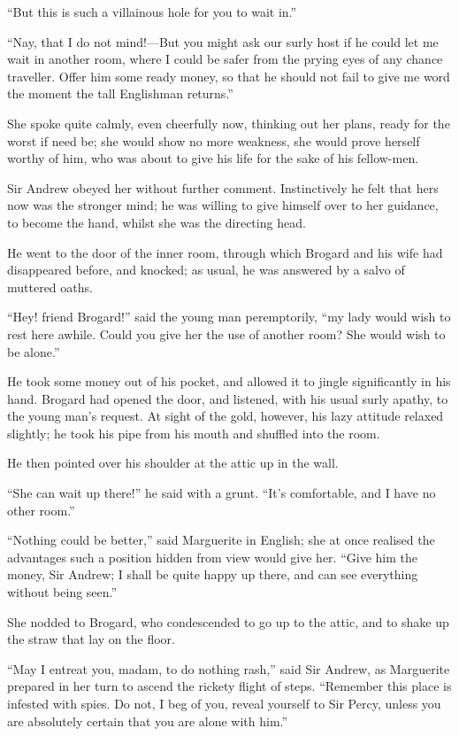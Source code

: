 \documentclass[paper=5.5in:8.5in,BCOR=7mm,twoside,DIV=calc,12pt,usegeometry,chapterprefix,endperiod,headings=big]{scrbook}
\begin{document}
\enquote{But this is such a villainous hole for you to wait in.}

\enquote{Nay, that I do not mind!---But you might ask our surly host if he could let me wait in another room, where I could be safer from the prying eyes of any chance traveller. Offer him some ready money, so that he should not fail to give me word the moment the tall Englishman returns.}

She spoke quite calmly, even cheerfully now, thinking out her plans, ready for the worst if need be; she would show no more weakness, she would prove herself worthy of him, who was about to give his life for the sake of his fellow-men.

Sir Andrew obeyed her without further comment. Instinctively he felt that hers now was the stronger mind; he was willing to give himself over to her guidance, to become the hand, whilst she was the directing head.

He went to the door of the inner room, through which Brogard and his wife had disappeared before, and knocked; as usual, he was answered by a salvo of muttered oaths.

\enquote{Hey! friend Brogard!} said the young man peremptorily, \enquote{my lady would wish to rest here awhile. Could you give her the use of another room? She would wish to be alone.}

He took some money out of his pocket, and allowed it to jingle significantly in his hand. Brogard had opened the door, and listened, with his usual surly apathy, to the young man's request. At sight of the gold, however, his lazy attitude relaxed slightly; he took his pipe from his mouth and shuffled into the room.

He then pointed over his shoulder at the attic up in the wall.

\enquote{She can wait up there!} he said with a grunt. \enquote{It's comfortable, and I have no other room.}

\enquote{Nothing could be better,} said Marguerite in English; she at once realised the advantages such a position hidden from view would give her. \enquote{Give him the money, Sir Andrew; I shall be quite happy up there, and can see everything without being seen.}

She nodded to Brogard, who condescended to go up to the attic, and to shake up the straw that lay on the floor.

\enquote{May I entreat you, madam, to do nothing rash,} said Sir Andrew, as Marguerite prepared in her turn to ascend the rickety flight of steps. \enquote{Remember this place is infested with spies. Do not, I beg of you, reveal yourself to Sir Percy, unless you are absolutely certain that you are alone with him.}
\end{document}
